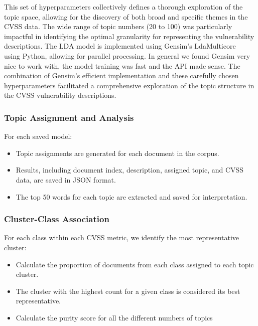 This set of hyperparameters collectively defines a thorough exploration of the topic space, allowing
for the discovery of both broad and specific themes in the CVSS data. The wide range of topic
numbers (20 to 100) was particularly impactful in identifying the optimal granularity for
representing the vulnerability descriptions. The LDA model is implemented using Gensim's
LdaMulticore~\cite{gensim} using Python, allowing for parallel processing. In general we found Gensim very nice to work with, the model training was fast and the API made sense. The combination of Gensim's efficient implementation and these carefully chosen hyperparameters facilitated a comprehensive exploration of the topic structure in the CVSS vulnerability descriptions.

\subsubsection{Topic Assignment and Analysis}

For each saved model:

\begin{itemize}
	\item Topic assignments are generated for each document in the corpus.
	\item Results, including document index, description, assigned topic, and CVSS data, are saved in JSON format.
	\item The top 50 words for each topic are extracted and saved for interpretation.
\end{itemize}

\subsubsection{Cluster-Class Association}

For each class within each CVSS metric, we identify the most representative cluster:

\begin{itemize}
	\item Calculate the proportion of documents from each class assigned to each topic cluster.
	\item The cluster with the highest count for a given class is considered its best representative.
	\item Calculate the purity score for all the different numbers of topics
\end{itemize}

